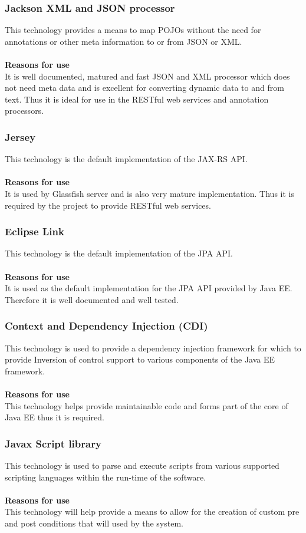 \documentclass[12pt]{article}
\begin{document}
\subsubsection{Jackson XML and JSON processor}
This technology provides a means to map POJOs without the need for annotations or other meta information to or from JSON or XML.\\\\
\textbf{Reasons for use}\\
It is well documented, matured and fast JSON and XML processor which does not need meta data and is excellent for converting dynamic data to and from text. Thus it is ideal for use in the RESTful web services and annotation processors.

\subsubsection{Jersey}
This technology is the default implementation of the JAX-RS API.\\\\
\textbf{Reasons for use}\\
It is used by Glassfish server and is also very mature implementation. Thus it is required by the project to provide RESTful web services.

\subsubsection{Eclipse Link}
This technology is the default implementation of the JPA API.\\\\
\textbf{Reasons for use}\\
It is used as the default implementation for the JPA API provided by Java EE. Therefore it is well documented and well tested.

\subsubsection{Context and Dependency Injection (CDI)}
This technology is used to provide a dependency injection framework for which to provide Inversion of control support to various components of the Java EE framework.\\\\
\textbf{Reasons for use}\\
This technology helps provide maintainable code and forms part of the core of Java EE thus it is required.

\subsubsection{Javax Script library}
This technology is used to parse and execute scripts from various supported scripting languages within the run-time of the software.\\\\
\textbf{Reasons for use}\\
This technology will help provide a means to allow for the creation of custom pre and post conditions that will used by the system.
\end{document}
